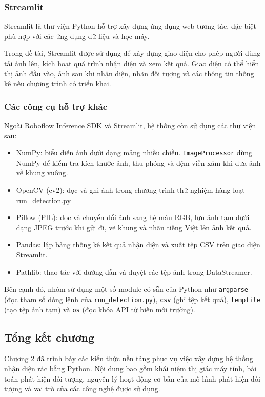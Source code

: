 \documentclass[a4paper,13pt]{extarticle}
\begin{document}
\subsubsection{Streamlit}
Streamlit là thư viện Python hỗ trợ xây dựng ứng dụng web tương tác, đặc biệt phù hợp với các ứng dụng dữ liệu và học máy.

Trong đề tài, Streamlit được sử dụng để xây dựng giao diện cho phép người dùng tải ảnh lên, kích hoạt quá trình nhận diện và xem kết quả. Giao diện có thể hiển thị ảnh đầu vào, ảnh sau khi nhận diện, nhãn đối tượng và các thông tin thống kê nếu chương trình có triển khai.

\subsubsection{Các công cụ hỗ trợ khác}
Ngoài Roboflow Inference SDK và Streamlit, hệ thống còn sử dụng các thư viện sau:
\begin{itemize}
    \item[-] {NumPy:} biểu diễn ảnh dưới dạng mảng nhiều chiều. \texttt{ImageProcessor} dùng NumPy để kiểm tra kích thước ảnh, thu phóng và đệm viền xám khi đưa ảnh về khung vuông.
    \item[-]{OpenCV (cv2):} đọc và ghi ảnh trong chương trình thử nghiệm hàng loạt {run\_detection.py}
    \item[-] {Pillow (PIL):} đọc và chuyển đổi ảnh sang hệ màu RGB, lưu ảnh tạm dưới dạng JPEG trước khi gửi đi, vẽ khung và nhãn tiếng Việt lên ảnh kết quả.
    \item [-]{Pandas:} lập bảng thống kê kết quả nhận diện và xuất tệp CSV trên giao diện Streamlit.
    \item [-]{Pathlib:} thao tác với đường dẫn và duyệt các tệp ảnh trong {DataStreamer}.
\end{itemize}
Bên cạnh đó, nhóm sử dụng một số module có sẵn của Python như \texttt{argparse} (đọc tham số dòng lệnh của \texttt{run\_detection.py}), \texttt{csv} (ghi tệp kết quả), \texttt{tempfile} (tạo tệp ảnh tạm) và \texttt{os} (đọc khóa API từ biến môi trường).
\subsection{Tổng kết chương}
Chương 2 đã trình bày các kiến thức nền tảng phục vụ việc xây dựng hệ thống nhận diện rác bằng Python. Nội dung bao gồm khái niệm thị giác máy tính, bài toán phát hiện đối tượng, nguyên lý hoạt động cơ bản của mô hình phát hiện đối tượng và vai trò của các công nghệ được sử dụng.
\end{document}
